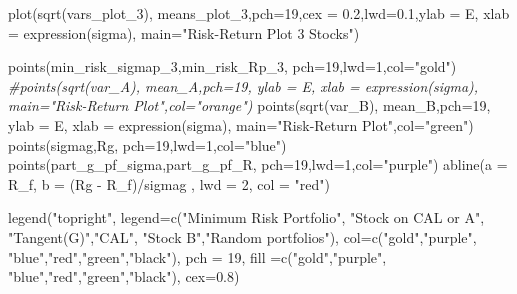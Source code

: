 \documentclass[
]{article}
\newenvironment{Shaded}{\begin{snugshade}}{\end{snugshade}}
\newcommand{\AttributeTok}[1]{\textcolor[rgb]{0.77,0.63,0.00}{#1}}
\newcommand{\CommentTok}[1]{\textcolor[rgb]{0.56,0.35,0.01}{\textit{#1}}}
\newcommand{\DecValTok}[1]{\textcolor[rgb]{0.00,0.00,0.81}{#1}}
\newcommand{\FloatTok}[1]{\textcolor[rgb]{0.00,0.00,0.81}{#1}}
\newcommand{\FunctionTok}[1]{\textcolor[rgb]{0.00,0.00,0.00}{#1}}
\newcommand{\NormalTok}[1]{#1}
\newcommand{\SpecialCharTok}[1]{\textcolor[rgb]{0.00,0.00,0.00}{#1}}
\newcommand{\StringTok}[1]{\textcolor[rgb]{0.31,0.60,0.02}{#1}}
\begin{document}
\begin{Shaded}
\begin{Highlighting}[]
\FunctionTok{plot}\NormalTok{(}\FunctionTok{sqrt}\NormalTok{(vars\_plot\_3), means\_plot\_3,}\AttributeTok{pch=}\DecValTok{19}\NormalTok{,}\AttributeTok{cex =} \FloatTok{0.2}\NormalTok{,}\AttributeTok{lwd=}\FloatTok{0.1}\NormalTok{,}\AttributeTok{ylab =} \StringTok{\textquotesingle{}E\textquotesingle{}}\NormalTok{, }\AttributeTok{xlab =} \FunctionTok{expression}\NormalTok{(sigma), }\AttributeTok{main=}\StringTok{"Risk{-}Return Plot 3 Stocks"}\NormalTok{) }

\FunctionTok{points}\NormalTok{(min\_risk\_sigmap\_3,min\_risk\_Rp\_3, }\AttributeTok{pch=}\DecValTok{19}\NormalTok{,}\AttributeTok{lwd=}\DecValTok{1}\NormalTok{,}\AttributeTok{col=}\StringTok{"gold"}\NormalTok{)}
\CommentTok{\#points(sqrt(var\_A), mean\_A,pch=19, ylab = \textquotesingle{}E\textquotesingle{}, xlab = expression(sigma), main="Risk{-}Return Plot",col="orange") }
\FunctionTok{points}\NormalTok{(}\FunctionTok{sqrt}\NormalTok{(var\_B), mean\_B,}\AttributeTok{pch=}\DecValTok{19}\NormalTok{, }\AttributeTok{ylab =} \StringTok{\textquotesingle{}E\textquotesingle{}}\NormalTok{, }\AttributeTok{xlab =} \FunctionTok{expression}\NormalTok{(sigma), }\AttributeTok{main=}\StringTok{"Risk{-}Return Plot"}\NormalTok{,}\AttributeTok{col=}\StringTok{"green"}\NormalTok{) }
\FunctionTok{points}\NormalTok{(sigmag,Rg, }\AttributeTok{pch=}\DecValTok{19}\NormalTok{,}\AttributeTok{lwd=}\DecValTok{1}\NormalTok{,}\AttributeTok{col=}\StringTok{"blue"}\NormalTok{)}
\FunctionTok{points}\NormalTok{(part\_g\_pf\_sigma,part\_g\_pf\_R, }\AttributeTok{pch=}\DecValTok{19}\NormalTok{,}\AttributeTok{lwd=}\DecValTok{1}\NormalTok{,}\AttributeTok{col=}\StringTok{"purple"}\NormalTok{)}
\FunctionTok{abline}\NormalTok{(}\AttributeTok{a =}\NormalTok{ R\_f, }\AttributeTok{b =}\NormalTok{ (Rg }\SpecialCharTok{{-}}\NormalTok{ R\_f)}\SpecialCharTok{/}\NormalTok{sigmag , }\AttributeTok{lwd =} \DecValTok{2}\NormalTok{, }\AttributeTok{col =} \StringTok{"red"}\NormalTok{)}


\FunctionTok{legend}\NormalTok{(}\StringTok{"topright"}\NormalTok{, }
       \AttributeTok{legend=}\FunctionTok{c}\NormalTok{(}\StringTok{"Minimum Risk Portfolio"}\NormalTok{, }\StringTok{"Stock on CAL or A"}\NormalTok{, }\StringTok{"Tangent(G)"}\NormalTok{,}\StringTok{"CAL"}\NormalTok{, }\StringTok{"Stock B"}\NormalTok{,}\StringTok{"Random portfolios"}\NormalTok{),}
       \AttributeTok{col=}\FunctionTok{c}\NormalTok{(}\StringTok{"gold"}\NormalTok{,}\StringTok{"purple"}\NormalTok{, }\StringTok{"blue"}\NormalTok{,}\StringTok{"red"}\NormalTok{,}\StringTok{"green"}\NormalTok{,}\StringTok{"black"}\NormalTok{),}
       \AttributeTok{pch =} \DecValTok{19}\NormalTok{,}
       \AttributeTok{fill =}\FunctionTok{c}\NormalTok{(}\StringTok{"gold"}\NormalTok{,}\StringTok{"purple"}\NormalTok{, }\StringTok{"blue"}\NormalTok{,}\StringTok{"red"}\NormalTok{,}\StringTok{"green"}\NormalTok{,}\StringTok{"black"}\NormalTok{),}
       \AttributeTok{cex=}\FloatTok{0.8}\NormalTok{)}
\end{Highlighting}
\end{Shaded}
\end{document}
